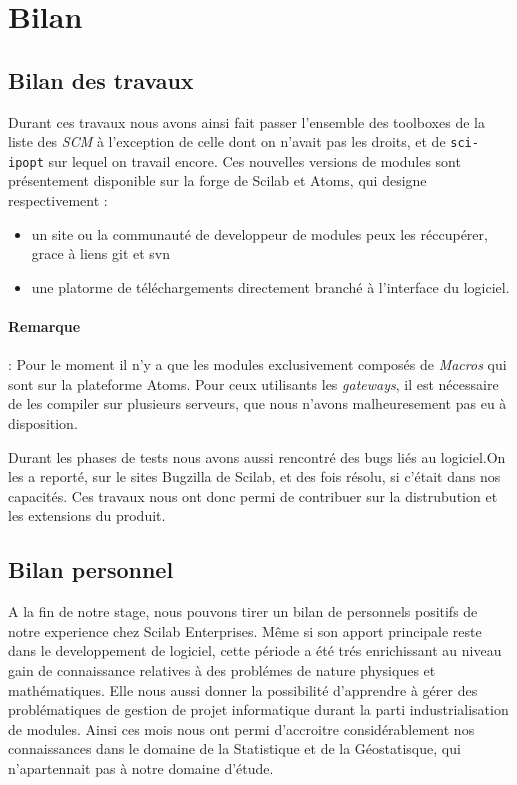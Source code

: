\section{Bilan}

\subsection{Bilan des travaux}
Durant ces travaux nous avons ainsi fait passer l’ensemble des toolboxes
de la liste des {\it SCM} \`a l’exception de celle dont on n'avait pas les droits,
et de {\tt sci-ipopt} sur lequel on travail encore. 
Ces nouvelles versions de modules sont présentement disponible
sur la forge de Scilab et Atoms, qui designe respectivement :

\begin{itemize}
\item un site ou la communauté de developpeur de modules peux les réccupérer,
grace à liens git et svn
\item une platorme de téléchargements directement branché à l'interface du logiciel.
\end{itemize}

\paragraph{Remarque} :
Pour le moment il n'y a que les modules exclusivement composés
de {\it Macros} qui sont sur la plateforme Atoms.
Pour ceux utilisants les {\it gateways}, il est nécessaire de les
compiler sur plusieurs serveurs, que nous n'avons malheuresement
pas eu à disposition.

Durant les phases de tests nous avons aussi rencontré des bugs liés au logiciel.On les
a reporté, sur le sites Bugzilla de Scilab, et des fois résolu, si c'était dans nos capacités.
Ces travaux nous ont donc permi de contribuer sur la distrubution et les extensions du produit.

\subsection{Bilan personnel}
A la fin de notre stage, nous pouvons tirer un bilan de personnels positifs de notre experience chez
Scilab Enterprises. Même si son apport principale reste dans le developpement de logiciel, cette période
a été trés enrichissant au niveau gain de connaissance relatives à des problémes de nature physiques et mathématiques.
Elle nous aussi donner la possibilité d'apprendre à gérer des problématiques de gestion de projet informatique durant la
parti industrialisation de modules.
Ainsi ces mois nous ont permi d'accroitre considérablement nos connaissances dans le domaine de la Statistique
et de la Géostatisque, qui n'apartennait pas à notre domaine d'étude.

